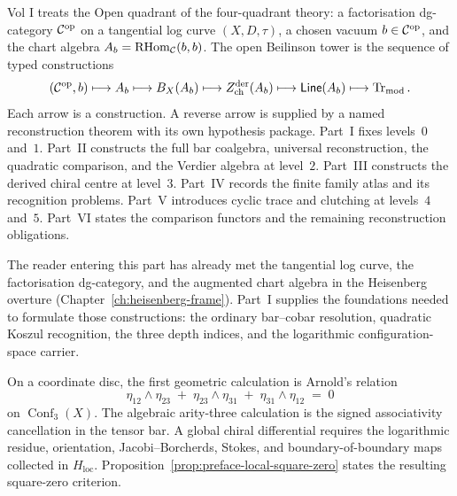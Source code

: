 \documentclass[11pt]{memoir}
\providecommand{\op}{\mathrm{op}}
\begin{document}
\label{ch:cy-to-chiral-functor}%
\label{V3-ch:cy-to-chiral}%
\label{chap:higher-genus-modular-koszul}%

\label{ch:genus-complete}%
\label{ch:k3e-bkm-chapter}%
\label{chap:factorization-swiss-cheese}%

\noindent
Vol I treats the Open quadrant of the four-quadrant theory: a
factorisation dg-category $\cC^{\op}$ on a tangential log curve
$(X, D, \tau)$, a chosen vacuum $b \in \cC^{\op}$, and the chart
algebra
$A_b=\operatorname{RHom}_{\mathcal{C}}(b,b)$.  The open Beilinson tower is
the sequence of typed constructions
\[
 (\cC^{\op},b)
 \longmapsto A_b
 \longmapsto B_X(A_b)
 \longmapsto Z^{\mathrm{der}}_{\mathrm{ch}}(A_b)
 \longmapsto \mathsf{Line}(A_b)
 \longmapsto \operatorname{Tr}_{\mathrm{mod}}.
\]
Each arrow is a construction.  A reverse arrow is supplied by a named
reconstruction theorem with its own hypothesis package.  Part~I fixes
levels~$0$ and~$1$.  Part~II constructs the full bar coalgebra,
universal reconstruction, the quadratic comparison, and the Verdier
algebra at level~$2$.  Part~III constructs the derived chiral centre at
level~$3$.  Part~IV records the finite family atlas and its
recognition problems.  Part~V introduces cyclic trace and clutching
at levels~$4$ and~$5$.  Part~VI states the comparison functors and the
remaining reconstruction obligations.

The reader entering this part has already met the tangential log
curve, the factorisation dg-category, and the augmented chart algebra
in the Heisenberg overture
(Chapter~\ref{ch:heisenberg-frame}). Part~I supplies the
foundations needed to formulate those constructions: the ordinary
bar--cobar resolution, quadratic Koszul recognition, the three depth
indices, and the logarithmic configuration-space carrier.

On a coordinate disc, the first geometric calculation is Arnold's
relation
\[
\eta_{12} \wedge \eta_{23}
\;+\; \eta_{23} \wedge \eta_{31}
\;+\; \eta_{31} \wedge \eta_{12}
\;=\; 0
\]
on $\operatorname{Conf}_3(X)$.  The algebraic arity-three calculation
is the signed associativity cancellation in the tensor bar.  A global
chiral differential requires the logarithmic residue, orientation,
Jacobi--Borcherds, Stokes, and boundary-of-boundary maps collected in
$H_{\mathrm{loc}}$.  Proposition~\ref{prop:preface-local-square-zero}
states the resulting square-zero criterion.
\end{document}
